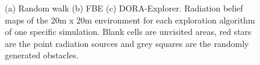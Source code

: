 \begin{figure}[htbp]
    \centering
    \caption{(a) Random walk (b) FBE (c) DORA-Explorer. Radiation belief maps of the 20m x 20m environment for each exploration algorithm of one specific simulation. Blank cells are unvisited areas, red stars are the point radiation sources and grey squares are the randomly generated obstacles.}
    \label{results:belief}
\end{figure}


